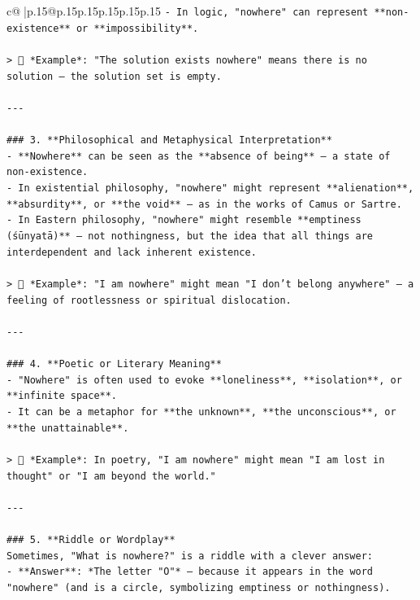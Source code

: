 \documentclass{article}
\begin{document}
{\begin{supertabular}{c@{$\;$}|p{.15\linewidth}@{}p{.15\linewidth}p{.15\linewidth}p{.15\linewidth}p{.15\linewidth}p{.15\linewidth}}
{{{\texttt{{-} In logic, "nowhere" can represent **non{-}existence** or **impossibility**.} \\
\\ 
\texttt{> 🧮 *Example*: "The solution exists nowhere" means there is no solution — the solution set is empty.} \\
\\ 
\texttt{{-}{-}{-}} \\
\\ 
\texttt{\#\#\# 3. **Philosophical and Metaphysical Interpretation**} \\
\texttt{{-} **Nowhere** can be seen as the **absence of being** — a state of non{-}existence.} \\
\texttt{{-} In existential philosophy, "nowhere" might represent **alienation**, **absurdity**, or **the void** — as in the works of Camus or Sartre.} \\
\texttt{{-} In Eastern philosophy, "nowhere" might resemble **emptiness (śūnyatā)** — not nothingness, but the idea that all things are interdependent and lack inherent existence.} \\
\\ 
\texttt{> 🌿 *Example*: "I am nowhere" might mean "I don’t belong anywhere" — a feeling of rootlessness or spiritual dislocation.} \\
\\ 
\texttt{{-}{-}{-}} \\
\\ 
\texttt{\#\#\# 4. **Poetic or Literary Meaning**} \\
\texttt{{-} "Nowhere" is often used to evoke **loneliness**, **isolation**, or **infinite space**.} \\
\texttt{{-} It can be a metaphor for **the unknown**, **the unconscious**, or **the unattainable**.} \\
\\ 
\texttt{> 📜 *Example*: In poetry, "I am nowhere" might mean "I am lost in thought" or "I am beyond the world."} \\
\\ 
\texttt{{-}{-}{-}} \\
\\ 
\texttt{\#\#\# 5. **Riddle or Wordplay**} \\
\texttt{Sometimes, "What is nowhere?" is a riddle with a clever answer:} \\
\texttt{{-} **Answer**: *The letter "O"* — because it appears in the word "nowhere" (and is a circle, symbolizing emptiness or nothingness).} \\
}}}
\end{supertabular}}
\end{document}
